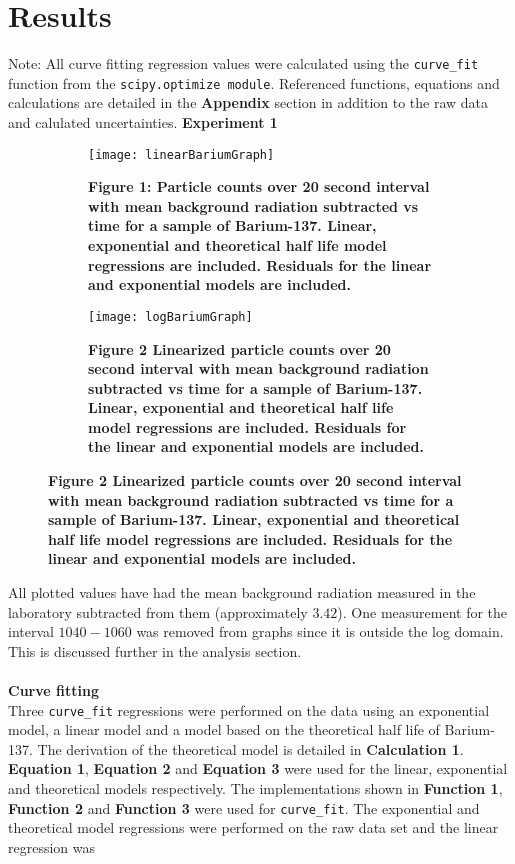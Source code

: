 \documentclass[
	letterpaper, %
	10pt, %
]{CSUniSchoolLabReport}
\begin{document}
\section{Results}
Note: All curve fitting regression values were calculated using the \lstinline{curve_fit} function from the \lstinline{scipy.optimize module}. Referenced functions, equations and calculations are detailed in the \textbf{Appendix} section in addition to the raw data and calulated uncertainties.
\newpage
{\Large\textbf{Experiment 1}}
\begin{figure}[H]
	\begin{subfigure}{0.45\textwidth}
		\texttt{[image: linearBariumGraph]}
		\caption{\textbf{Figure 1: Particle counts over 20 second interval with mean background radiation subtracted vs time for a sample of Barium-137. Linear, exponential and theoretical half life model regressions are included. Residuals for the linear and exponential models are included.}}
	\end{subfigure}
	\quad
	\begin{subfigure}{0.45\textwidth}
		\texttt{[image: logBariumGraph]}
		\caption{\textbf{Figure 2 Linearized particle counts over 20 second interval with mean background radiation subtracted vs time for a sample of Barium-137.  Linear, exponential and theoretical half life model regressions are included. Residuals for the linear and exponential models are included.}}
	\end{subfigure}
\end{figure}
All plotted values have had the mean background radiation measured in the laboratory subtracted from
them (approximately $3.42$). One measurement for the interval $1040-1060$ was removed from graphs since
it is outside the log domain. This is discussed further in the analysis section.\\\\
{\large\textbf{Curve fitting}}\\
Three \lstinline{curve_fit} regressions were performed on the data using an exponential model, a linear model and a
model based on the theoretical half life of Barium-137. The derivation of the theoretical model is detailed in
\textbf{Calculation 1}. \textbf{Equation 1}, \textbf{Equation 2} and \textbf{Equation 3} were used for the linear, exponential and
theoretical models respectively. The implementations shown in \textbf{Function 1}, \textbf{Function 2} and \textbf{Function 3} were used for \lstinline{curve_fit}. The exponential
and theoretical model regressions were performed on the raw data set and the linear regression was
\end{document}
